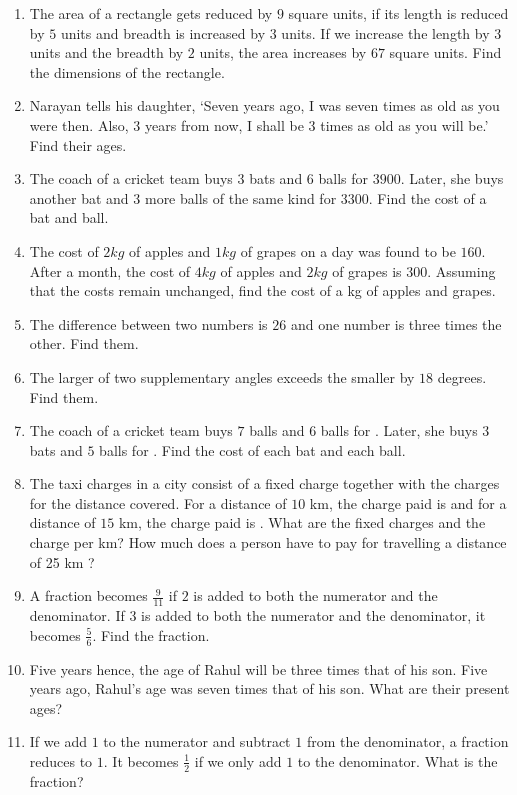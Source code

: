 \begin{enumerate}[label=\thesubsection.\arabic*, ref=\thesubsection.\theenumi]
\item The area of a rectangle gets reduced by $9$ square units,  if its length is reduced by $5$ units and breadth is increased by $3$ units.  If we increase the length by $3$ units and the breadth by $2$ units,  the area increases by $67$ square units.  Find the dimensions of the rectangle. 
\item Narayan tells his daughter,  `Seven years ago,  I was seven times as old as you were then.  Also,  $3$ years from now,  I shall be $3$ times as old as  you will be.' Find their ages.  
\item The coach of a cricket team buys $3$ bats and $6$ balls for  \rupee $ 3900$.  Later,  she buys another bat and $3$ more balls of the same kind for  \rupee $ 3300$.  Find the cost of a bat and ball. 
\item The cost of $2kg$ of apples and $1kg$ of grapes on a day was found to be  \rupee $ 160$.  After a month,  the cost of $4kg$ of apples and $2kg$ of grapes is  \rupee $ 300$.  Assuming that the costs remain unchanged,  find the cost of a kg of apples and grapes.  
    \item The difference between two numbers is $26$ and one number is three times the other.  Find them. 
    \item The larger of two supplementary angles exceeds the smaller by $18$ degrees.  Find them. 
    \item The coach of a cricket team buys $7$ balls and $6$ balls for .  Later,  she buys $3$ bats and $5$ balls for .  Find the cost of each bat and each ball. 
    \item The taxi charges in a city consist of a fixed charge together with the charges for the distance covered.  For a distance of $10$ km,  the charge paid is  and for a distance of $15$ km,  the charge paid is .  What are the fixed charges and the charge per km? How much does a person have to pay for travelling a distance of 25 km ? 
    \item A fraction becomes $\frac{9}{11}$ if $2$ is added to both the numerator and the denominator.  If $3$ is added to both the numerator and the denominator,  it becomes $\frac{5}{6}$.  Find the fraction. 
    \item Five years hence,  the age of Rahul will be three times that of his son.  Five years ago,  Rahul's age was seven times that of his son.  What are their present ages?
\item If we add $1$ to the numerator and subtract $1$ from the denominator,  a fraction reduces to $1$.  It becomes $\frac{1}{2}$ if we only add $1$ to the denominator.  What is the fraction?

\end{enumerate}
